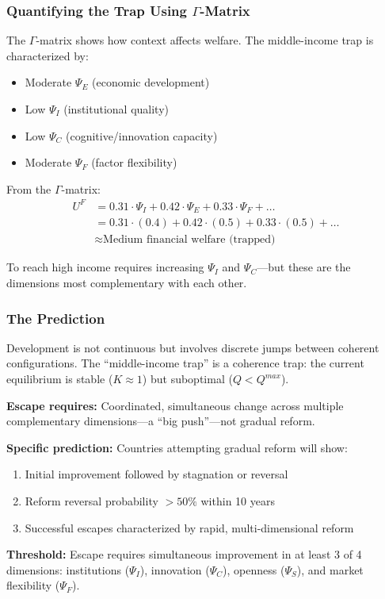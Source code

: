 \subsubsection{Quantifying the Trap Using $\Gamma$-Matrix}

The $\Gamma$-matrix shows how context affects welfare. The middle-income 
trap is characterized by:
\begin{itemize}
  \item Moderate $\Psi_E$ (economic development)
  \item Low $\Psi_I$ (institutional quality)
  \item Low $\Psi_C$ (cognitive/innovation capacity)
  \item Moderate $\Psi_F$ (factor flexibility)
\end{itemize}

From the $\Gamma$-matrix:
\begin{align*}
U^F &= 0.31 \cdot \Psi_I + 0.42 \cdot \Psi_E + 0.33 \cdot \Psi_F + \ldots \\
&= 0.31 \cdot (0.4) + 0.42 \cdot (0.5) + 0.33 \cdot (0.5) + \ldots \\
&\approx \text{Medium financial welfare (trapped)}
\end{align*}

To reach high income requires increasing $\Psi_I$ and $\Psi_C$---but these 
are the dimensions most complementary with each other.

\subsubsection{The Prediction}

\begin{tcolorbox}[colback=blue!5!white, colframe=blue!75!black, title=Prediction 6: The Coherence Trap]
Development is not continuous but involves discrete jumps between coherent 
configurations. The ``middle-income trap'' is a coherence trap: the current 
equilibrium is stable ($K \approx 1$) but suboptimal ($Q < Q^{max}$).

\textbf{Escape requires:} Coordinated, simultaneous change across multiple 
complementary dimensions---a ``big push''---not gradual reform.

\textbf{Specific prediction:} Countries attempting gradual reform will show:
\begin{enumerate}
  \item Initial improvement followed by stagnation or reversal
  \item Reform reversal probability $>50\%$ within 10 years
  \item Successful escapes characterized by rapid, multi-dimensional reform
\end{enumerate}

\textbf{Threshold:} Escape requires simultaneous improvement in at least 
3 of 4 dimensions: institutions ($\Psi_I$), innovation ($\Psi_C$), 
openness ($\Psi_S$), and market flexibility ($\Psi_F$).
\end{tcolorbox}


